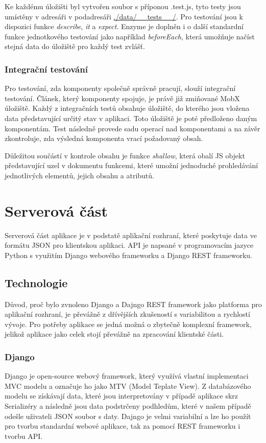 \documentclass[a4paper,11pt,titlepage,fleqn]{article}
\begin{document}
            Ke každému úložišti byl vytvořen soubor s příponou .test.js, tyto testy jsou umístěny v adresáři v podadresáři \url{./data/__tests__/}. Pro testování jsou k dispozici funkce \textit{describe}, \textit{it} a \textit{expect}. Enzyme je doplněn i o další standardní funkce jednotkového testování jako například \textit{beforeEach}, která umožňuje načíst stejná data do úložiště pro každý test zvlášť.

        \subsubsection{Integrační testování}
            Pro testování, zda komponenty společně správně pracují, slouží integrační testování. Článek, který komponenty spojuje, je právě již zmiňované MobX úložiště. Každý z integračních testů obsahuje úložiště, do kterého jsou vložena data představující určitý stav v aplikaci. Toto úložiště je poté předloženo daným komponentám. Test následně provede sadu operací nad komponentami a na závěr zkontroluje, zda výsledná komponenta vrací požadovaný obsah.

            Důležitou součástí v kontrole obsahu je funkce \textit{shallow}, která obalí JS objekt představující uzel v dokumentu funkcemi, které umožní jednoduché prohledávání jednotlivých elementů, jejich obsahu a atributů.

\newpage
\section{Serverová část}
    Serverová část aplikace je v podstatě aplikační rozhraní, které poskytuje data ve formátu JSON pro klientskou aplikaci. API je napsané v programovacím jazyce Python s využitím Django webového frameworku a Django REST frameworku.
    
    \subsection{Technologie}
        Důvod, proč bylo zvnoleno Django a Dajngo REST framework jako platforma pro aplikační rozhraní, je převážně z dřívějších zkušeností s variabilitou a rychlostí vývoje. Pro potřeby aplikace se jedná možná o zbytečně komplexní framework, jelikož aplikace jako celek stojí převážně na zpracování klientské části.

        \subsubsection{Django}
            Django je open-source webový framework, který využívá vlastní implementaci MVC modelu a označuje ho jako MTV (Model Teplate View)\cite{bib:django}. Z databázového modelu se získávají data, které jsou interpretovány v případě aplikace skrz Serializéry a následně jsou data podstrčeny podhledům, které v našem případě odešle uživateli JSON soubor s daty. Dajngo je velmi variabilní a lze ho použít pro tvorbu standardní webové aplikace, tak za pomocí REST frameworku i tvorbu API.
\end{document}
